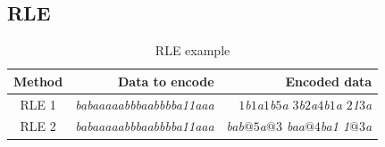\documentclass[thesis=M,english]{FITthesis}[2012/10/20]
\begin{document}

	\subsection{RLE}

\begin{table}\centering
	\caption{RLE example}\label{tab:RLE-example}
	\begin{tabular}{|c|r|r|}
	\hline \textbf{Method} & \textbf{Data to encode} & \textbf{Encoded data} \\\hline
	RLE 1 & \textit{babaaaaabbbaabbbba11aaa} & \textit{$1$b$1$a$1$b$5$a $3$b$2$a$4$b$1$a $2$1$3$a} \\\hline
	RLE 2 & \textit{babaaaaabbbaabbbba11aaa} & \textit{bab$@5$a$@3$ baa$@4$ba1 1$@3$a} \\\hline
	\end{tabular}
\end{table}


\end{document}
